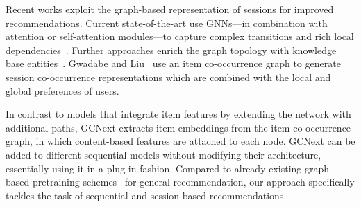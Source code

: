 Recent works exploit the graph-based representation of sessions for improved recommendations. Current state-of-the-art use GNNs---in combination with attention or self-attention modules---to capture complex transitions and rich local dependencies~\cite{wu2019session,xu2019graph}. Further approaches enrich the graph topology with knowledge base entities~\cite{wang2020knowledge,amjadi2021katrec}. Gwadabe and Liu~\cite{gwadabe2022ic} use an item co-occurrence graph to generate session co-occurrence representations which are combined with the local and global preferences of users.

In contrast to models that integrate item features by extending the network with additional paths, GCNext extracts item embeddings from the item co-occurrence graph, in which content-based features are attached to each node. GCNext can be added to different sequential models without modifying their architecture, essentially using it in a plug-in fashion. Compared to already existing graph-based pretraining schemes~\cite{pretrain2021meng,multimodal2022liu} for general recommendation, our approach specifically tackles the task of sequential and session-based recommendations.